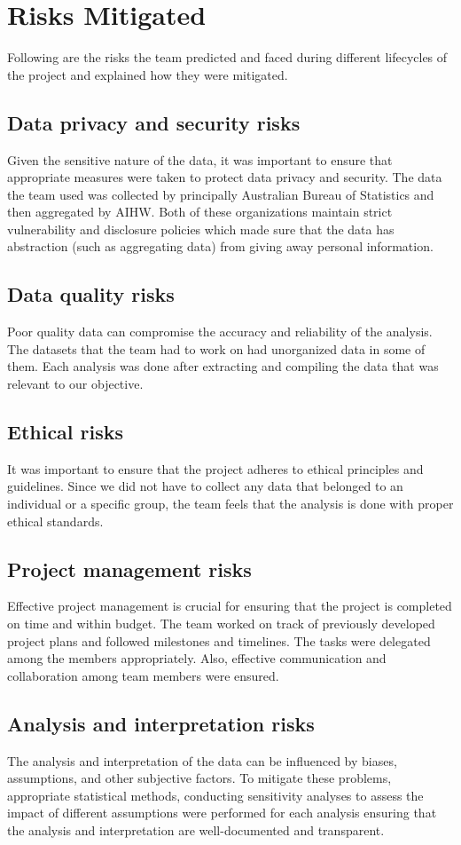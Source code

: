 \section{Risks Mitigated}
Following are the risks the team predicted and faced during different lifecycles of the project and explained how they were mitigated.

\subsection{Data privacy and security risks} Given the sensitive nature of the data, it was important to ensure that appropriate measures were taken to protect data privacy and security. The data the team used was collected by principally Australian Bureau of Statistics and then aggregated by AIHW. Both of these organizations maintain strict vulnerability and disclosure policies\cite{vulPol} which made sure that the data has abstraction (such as aggregating data) from giving away personal information.

\subsection{Data quality risks} Poor quality data can compromise the accuracy and reliability of the analysis. The datasets that the team had to work on had unorganized data in some of them. Each analysis was done after extracting and compiling the data that was relevant to our objective.

\subsection{Ethical risks} It was important to ensure that the project adheres to ethical principles and guidelines. Since we did not have to collect any data that belonged to an individual or a specific group, the team feels that the analysis is done with proper ethical standards.

\subsection{Project management risks} Effective project management is crucial for ensuring that the project is completed on time and within budget. The team worked on track of previously developed project plans  and followed milestones and timelines. The tasks were delegated among the members appropriately. Also, effective communication and collaboration among team members were ensured.

\subsection{Analysis and interpretation risks} The analysis and interpretation of the data can be influenced by biases, assumptions, and other subjective factors. To mitigate these problems, appropriate statistical methods, conducting sensitivity analyses to assess the impact of different assumptions were performed for each analysis ensuring that the analysis and interpretation are well-documented and transparent.
